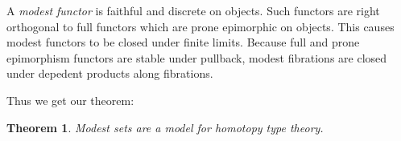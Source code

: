\documentclass{amsart}
\theoremstyle{plain}
\newtheorem{theorem}{Theorem}
\theoremstyle{definition}
\newcommand\hide[1]{}
\begin{document}
A \emph{modest functor} is faithful and discrete on objects. Such functors are right orthogonal to full functors which are prone epimorphic on objects. This causes modest functors to be closed under finite limits. Because full and prone epimorphism functors are stable under pullback, modest fibrations are closed under depedent products along fibrations.

Thus we get our theorem:
\begin{theorem} Modest sets are a model for homotopy type theory. \end{theorem}




\hide{
Eindsectie met bespreking van mogelijke localisaties/generalizaties

Boeiende eigenschappen van het model

Rosolini's topos nog ergens noemen?}





\hide{Het is moeilijk om te beslissen wat wel te vertellen en wat niet. Ik wil dat ergens in het midden laten, maar waar is dat?}


\hide{waar will we nu eidnelijk heen? generic modest arrow!}

\end{document}
